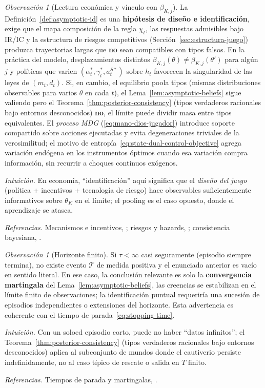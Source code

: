 \documentclass[12pt]{article}
\providecommand{\textcite}{\citet}
\theoremstyle{definition}
\theoremstyle{remark}
\newtheorem{remark}[theorem]{Observación}
\newcommand{\1}{\mathbf{1}}
\begin{document}
\begin{remark}[Lectura económica y vínculo con $\beta_{K,j}$]
La Definición~\ref{def:asymptotic-id} es una \textbf{hipótesis de diseño e identificación}, exige que el mapa composición de la regla $\chi_t$, las respuestas admisibles bajo IR/IC y la estructura de riesgos competitivos (Sección~\ref{sec:estructura-juego}) produzca trayectorias largas que \textbf{no} sean compatibles con tipos falsos. En la práctica del modelo, desplazamientos distintos $\beta_{K,j}(\theta)\neq\beta_{K,j}(\theta')$ para algún $j$ y políticas que varien $(\alpha_t^\ast,\gamma_t^\ast,a_t^{S\ast})$ sobre $h_t$ favorecen la singularidad de las leyes de $(m_t,d_t)$. Si, en cambio, el equilibrio poola tipos (mismas distribuciones observables para varios $\theta$ en cada $t$), el Lema~\ref{lem:asymptotic-beliefs} sigue valiendo pero el Teorema~\ref{thm:posterior-consistency} \textup{(}tipos verdaderos racionales bajo entornos desconocidos\textup{)} \textbf{no}, el límite puede dividir masa entre tipos equivalentes. El \textit{proceso MDG} (\eqref{eq:mano-dios-jugador}) introduce soporte compartido sobre acciones ejecutadas y evita degeneraciones triviales de la verosimilitud; el motivo de entropía~\eqref{eq:state-dual-control-objective} agrega variación endógena en los instrumentos óptimos cuando esa variación compra información, sin recurrir a choques continuos exógenos.

\noindent\emph{Intuición.} En economía, ``identificación'' aquí significa que el \emph{diseño del juego} \textup{(}política + incentivos + tecnología de riesgo\textup{)} hace observables suficientemente informativos sobre $\theta_K$ en el límite; el pooling es el caso opuesto, donde el aprendizaje se atasca.

\noindent\emph{Referencias.} Mecanismos e incentivos, \textcite{Myerson1979IC,FudenbergTirole1991}; riesgos y hazards, \textcite{Cox1972,Bradburn2003}; consistencia bayesiana, \textcite{Schervish1995Theory}.
\end{remark}

\begin{remark}[Horizonte finito]
\label{rmk:horizonte-finito-consistencia}
Si $\tau<\infty$ casi seguramente (episodio siempre termina), no existe evento $\mathcal{T}$ de medida positiva y el enunciado anterior es vacío en sentido literal. En ese caso, la conclusión relevante es solo la \textbf{convergencia martingala} del Lema~\ref{lem:asymptotic-beliefs}, las creencias se estabilizan en el límite finito de observaciones; la identificación puntual requeriría una sucesión de episodios independientes o extensiones del horizonte. Esta advertencia es coherente con el tiempo de parada~\eqref{eq:stopping-time}.

\noindent\emph{Intuición.} Con un soloed episodio corto, puede no haber ``datos infinitos''; el Teorema~\ref{thm:posterior-consistency} \textup{(}tipos verdaderos racionales bajo entornos desconocidos\textup{)} aplica al subconjunto de mundos donde el cautiverio persiste indefinidamente, no al caso típico de rescate o salida en $T$ finito.

\noindent\emph{Referencias.} Tiempos de parada y martingalas, \textcite{Williams1991Martingales,Shiryaev2019Probability}.
\end{remark}
\end{document}
